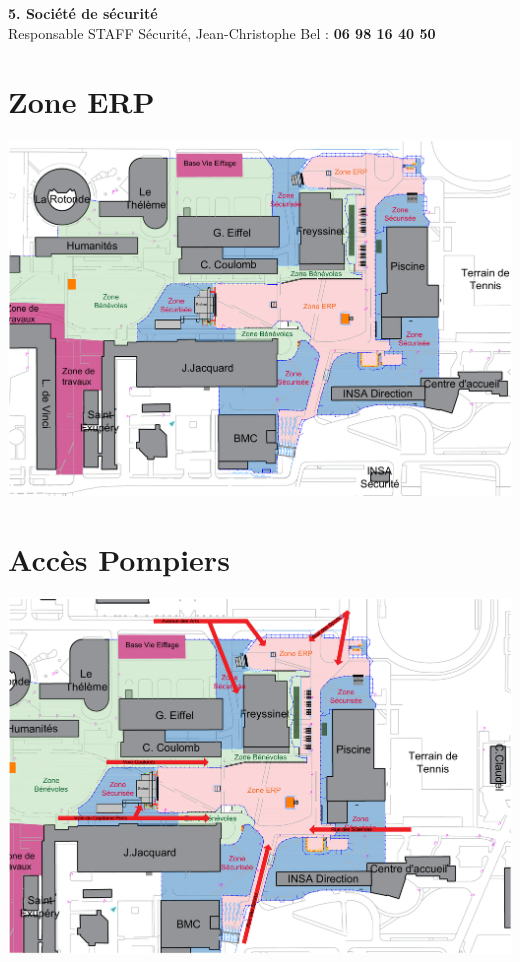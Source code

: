 \documentclass[hidelinks, paper=a4, fontsize=13pt]{report}
\begin{document}
\textbf{5. Société de sécurité}\\
Responsable STAFF Sécurité, Jean-Christophe Bel : \textbf{06 98 16 40 50}\\


\section{Zone ERP}
	
	\begin{center}\includegraphics[width=.95\textheight,angle=90]{Exports/Plan_24h_45eme-Plan_ERP}\end{center}
	

\section{Accès Pompiers}
	\begin{center}\includegraphics[width=.95\textheight,angle=90]{Exports/Plan_24h_45eme-Acces_Pompiers}\end{center}
\end{document}
